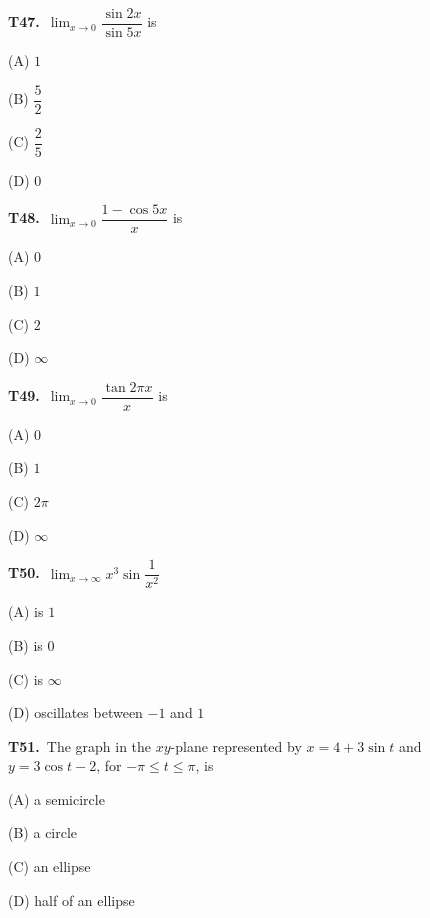 \documentclass[11pt]{article}
\begin{document}
\bigskip\noindent\textbf{T47.}\ $\displaystyle\lim_{x\to 0}\dfrac{\sin 2x}{\sin 5x}$ is
\begin{list}{}{\setlength{\leftmargin}{3em}\setlength{\labelwidth}{2.5em}\setlength{\itemsep}{0pt}\setlength{\topsep}{2pt}}
\item[(A)] $1$
\item[(B)] $\dfrac{5}{2}$
\item[(C)] $\dfrac{2}{5}$
\item[(D)] $0$
\end{list}

\bigskip\noindent\textbf{T48.}\ $\displaystyle\lim_{x\to 0}\dfrac{1-\cos 5x}{x}$ is
\begin{list}{}{\setlength{\leftmargin}{3em}\setlength{\labelwidth}{2.5em}\setlength{\itemsep}{0pt}\setlength{\topsep}{2pt}}
\item[(A)] $0$
\item[(B)] $1$
\item[(C)] $2$
\item[(D)] $\infty$
\end{list}

\bigskip\noindent\textbf{T49.}\ $\displaystyle\lim_{x\to 0}\dfrac{\tan 2\pi x}{x}$ is
\begin{list}{}{\setlength{\leftmargin}{3em}\setlength{\labelwidth}{2.5em}\setlength{\itemsep}{0pt}\setlength{\topsep}{2pt}}
\item[(A)] $0$
\item[(B)] $1$
\item[(C)] $2\pi$
\item[(D)] $\infty$
\end{list}

\bigskip\noindent\textbf{T50.}\ $\displaystyle\lim_{x\to\infty} x^3 \sin\dfrac{1}{x^2}$
\begin{list}{}{\setlength{\leftmargin}{3em}\setlength{\labelwidth}{2.5em}\setlength{\itemsep}{0pt}\setlength{\topsep}{2pt}}
\item[(A)] is $1$
\item[(B)] is $0$
\item[(C)] is $\infty$
\item[(D)] oscillates between $-1$ and $1$
\end{list}

\bigskip\noindent\textbf{T51.}\ The graph in the $xy$-plane represented by $x = 4+3\sin t$ and $y = 3\cos t - 2$, for $-\pi \leq t \leq \pi$, is
\begin{list}{}{\setlength{\leftmargin}{3em}\setlength{\labelwidth}{2.5em}\setlength{\itemsep}{0pt}\setlength{\topsep}{2pt}}
\item[(A)] a semicircle
\item[(B)] a circle
\item[(C)] an ellipse
\item[(D)] half of an ellipse
\end{list}
\end{document}
